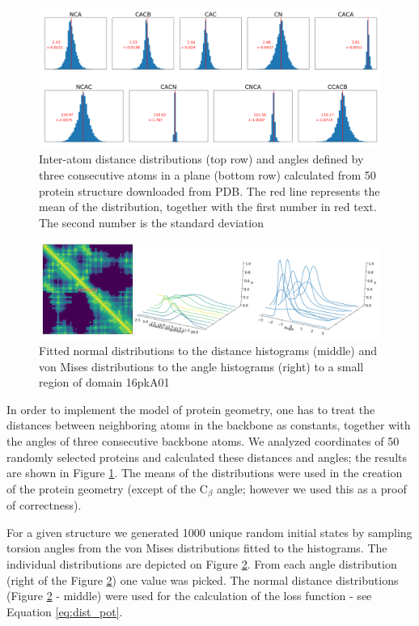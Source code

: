 \begin{figure}
    \centering
    \includegraphics[width=\linewidth]{imgs_tomas/inter_data.png}
    \caption{Inter-atom distance distributions (top row) and angles defined by three consecutive atoms in a plane (bottom row) calculated from 50 protein structure downloaded from PDB. The red line represents the mean of the distribution, together with the first number in red text. The second number is the standard deviation}
    \label{fig:interresidue}
\end{figure}

\begin{figure}
    \centering
    \includegraphics[width=\linewidth]{imgs_tomas/histograms2.png}
    \caption{Fitted normal distributions to the distance histograms (middle) and von Mises distributions to the angle histograms (right) to a small region of domain 16pkA01}
    \label{fig:distributions}
\end{figure}

In order to implement the model of protein geometry, one has to treat the distances between neighboring atoms in the backbone as constants, together with the angles of three consecutive backbone atoms. We analyzed coordinates of 50 randomly selected proteins and calculated these distances and angles; the results are shown in Figure \ref{fig:interresidue}. The means of the distributions were used in the creation of the protein geometry (except of the C$_\beta$ angle; however we used this as a proof of correctness).

For a given structure we generated 1000 unique random initial states by sampling torsion angles from the von Mises distributions fitted to the histograms. The individual distributions are depicted on Figure \ref{fig:distributions}. From each angle distribution (right of the Figure \ref{fig:distributions}) one value was picked. The normal distance distributions (Figure \ref{fig:distributions} - middle) were used for the calculation of the loss function - see Equation \ref{eq:dist_pot}.

